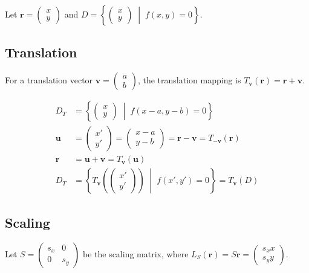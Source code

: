 \documentclass{article}
\renewcommand{\vec}[1]{\boldsymbol{#1}}
\begin{document}
Let $\vec{r} = \begin{pmatrix} x \\ y \end{pmatrix}$ and $D = \left\{ \begin{pmatrix} x \\ y \end{pmatrix} \;\middle|\; f(x, y) = 0 \right\}$.

\subsection{Translation}

For a translation vector $\vec{v} = \begin{pmatrix} a \\ b \end{pmatrix}$, the translation mapping is $T_{\vec{v}}(\vec{r}) = \vec{r} + \vec{v}$.

\begin{align*}
  D_T &= \left\{ \begin{pmatrix} x \\ y \end{pmatrix} \;\middle|\; f(x - a, y - b) = 0 \right\} \\[1ex]
  \vec{u} &= \begin{pmatrix} x' \\ y' \end{pmatrix} = \begin{pmatrix} x - a \\ y - b \end{pmatrix} = \vec{r} - \vec{v} = T_{-\vec{v}}(\vec{r}) \\[1ex]
  \vec{r} &= \vec{u} + \vec{v} = T_{\vec{v}}(\vec{u}) \\[1ex]
  D_T &= \left\{ T_{\vec{v}}\left( \begin{pmatrix} x' \\ y' \end{pmatrix} \right) \;\middle|\; f(x', y') = 0 \right\} = T_{\vec{v}}(D)
\end{align*}

\subsection{Scaling}

Let $S = \begin{pmatrix} s_x & 0 \\ 0 & s_y \end{pmatrix}$ be the scaling matrix, where $L_S(\vec{r}) = S\vec{r} = \begin{pmatrix} s_x x \\ s_y y \end{pmatrix}$.
\end{document}
